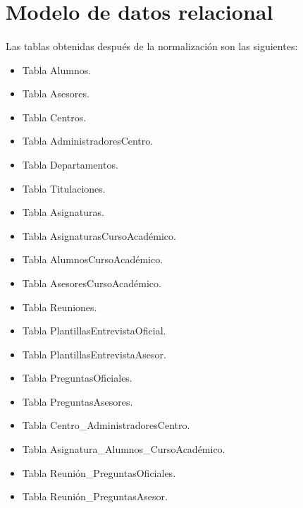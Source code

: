 \section{Modelo de datos relacional}

  \paragraph{}Las tablas obtenidas después de la normalización son las
  siguientes:

  \begin{itemize}
   \item Tabla Alumnos.
   \item Tabla Asesores.
   \item Tabla Centros.
   \item Tabla AdministradoresCentro.
   \item Tabla Departamentos.
   \item Tabla Titulaciones.
   \item Tabla Asignaturas.
   \item Tabla AsignaturasCursoAcadémico.
   \item Tabla AlumnosCursoAcadémico.
   \item Tabla AsesoresCursoAcadémico.
   \item Tabla Reuniones.
   \item Tabla PlantillasEntrevistaOficial.
   \item Tabla PlantillasEntrevistaAsesor.
   \item Tabla PreguntasOficiales.
   \item Tabla PreguntasAsesores.
   \item Tabla Centro\_AdministradoresCentro.
   \item Tabla Asignatura\_Alumnos\_CursoAcadémico.
   \item Tabla Reunión\_PreguntasOficiales.
   \item Tabla Reunión\_PreguntasAsesor.
  \end{itemize}


